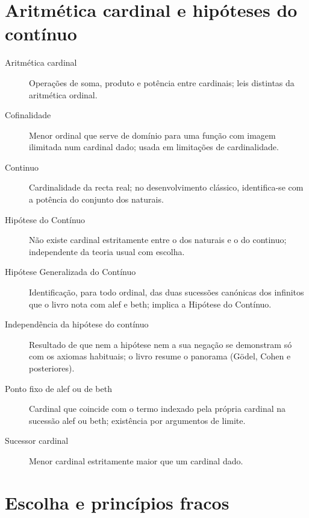 \section*{Aritmética cardinal e hipóteses do contínuo}

\begin{description}
\item[Aritmética cardinal] Operações de soma, produto e potência entre cardinais; leis distintas da aritmética ordinal.
\item[Cofinalidade] Menor ordinal que serve de domínio para uma função com imagem ilimitada num cardinal dado; usada em limitações de cardinalidade.
\item[Continuo] Cardinalidade da recta real; no desenvolvimento clássico, identifica-se com a potência do conjunto dos naturais.
\item[Hipótese do Contínuo] Não existe cardinal estritamente entre o dos naturais e o do continuo; independente da teoria usual com escolha.
\item[Hipótese Generalizada do Contínuo] Identificação, para todo ordinal, das duas sucessões canónicas dos infinitos que o livro nota com alef e beth; implica a Hipótese do Contínuo.
\item[Independência da hipótese do contínuo] Resultado de que nem a hipótese nem a sua negação se demonstram só com os axiomas habituais; o livro resume o panorama (Gödel, Cohen e posteriores).
\item[Ponto fixo de alef ou de beth] Cardinal que coincide com o termo indexado pela própria cardinal na sucessão alef ou beth; existência por argumentos de limite.
\item[Sucessor cardinal] Menor cardinal estritamente maior que um cardinal dado.
\end{description}

\section*{Escolha e princípios fracos}

